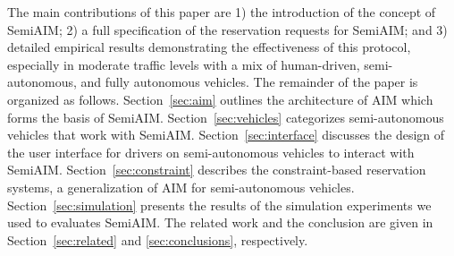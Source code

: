 The main contributions of this paper are 1) the introduction of the
concept of SemiAIM; 2) a full specification of the reservation
requests for SemiAIM; and 3) detailed empirical results demonstrating
the effectiveness of this protocol, especially in moderate traffic
levels with a mix of human-driven, semi-autonomous, and fully
autonomous vehicles.  The remainder of the paper is organized as
follows.  Section~\ref{sec:aim} outlines the architecture of AIM which
forms the basis of SemiAIM.  Section~\ref{sec:vehicles} categorizes
semi-autonomous vehicles that work with SemiAIM.
Section~\ref{sec:interface} discusses the design of the user interface
for drivers on semi-autonomous vehicles to interact with SemiAIM.
Section~\ref{sec:constraint} describes the constraint-based
reservation systems, a generalization of AIM for semi-autonomous
vehicles.  Section~\ref{sec:simulation} presents the results of the
simulation experiments we used to evaluates SemiAIM.  The related work
and the conclusion are given in Section~\ref{sec:related} and
\ref{sec:conclusions}, respectively.




